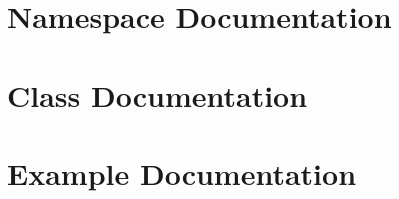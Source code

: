 \documentclass[twoside]{book}
\newcommand{\+}{\discretionary{\mbox{\scriptsize$\hookleftarrow$}}{}{}}
\begin{document}
\chapter{Namespace Documentation}

\chapter{Class Documentation}

























\chapter{Example Documentation}




\newpage
{}
{}
\printindex
\end{document}
